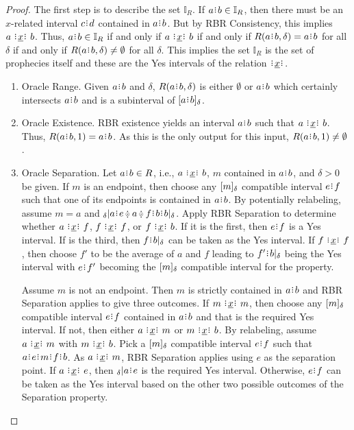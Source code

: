 \documentclass[12pt]{article}
\begin{document}
\begin{proof}

    The first step is to describe the set $\mathbb{I}_R$. If $a\rint b \in \mathbb{I}_R$, then there must be an $x$-related interval $c\rint d$ contained in $a\rint b$. But by RBR Consistency, this implies $a \xrel b$. Thus, $a\rint b \in \mathbb{I}_R$ if and only if $a \xrel b$ if and only if $R(a\rint b, \delta) = a\rint b$ for all $\delta$ if and only if $R(a\rint b, \delta) \neq \emptyset$ for all $\delta$. This implies the set $\mathbb{I}_R$ is the set of prophecies itself and these are the Yes intervals of the relation $\xrel$. 

    \begin{enumerate}
        \item Oracle Range. Given $a\rint b$ and $\delta$, $R(a\rint b, \delta)$ is either $\emptyset$ or $a\rint b$ which certainly intersects $a\rint b$ and is a subinterval  of $\halo{a\rint b}$.
        \item Oracle Existence. RBR existence yields an interval $a\rint b$ such that $a \xrel b$. Thus, $R(a\rint b, 1) = a\rint b$. As this is the only output for this input, $R(a\rint b, 1) \neq \emptyset$. 
        \item Oracle Separation. Let $a\rint b \in R$, i.e., $a \xrel b$, $m$ contained in $a\rint b$, and $\delta >0$ be given. If $m$ is an endpoint, then choose any $[m]_{\delta}$ compatible interval $e\rint f$ such that one of its endpoints is contained in $a\rint b$. By potentially relabeling, assume $m =a$ and ${}_\delta |a\rint e\betneq a \betneq f\rint b\rint b|_\delta$. Apply RBR Separation to determine whether $a \xrel f$, $f \xrel f$, or $f \xrel b$. If it is the first, then $e\rint f$ is a Yes interval. If is the third, then $f\rint b|_\delta$ can be taken as the Yes interval. If $f \xrel f$, then choose $f'$ to be the average of $a$ and $f$ leading to $f'\rint b|_\delta$ being the Yes interval with $e\rint f'$ becoming the $[m]_{\delta}$ compatible interval for the property. 

        Assume $m$ is not an endpoint. Then $m$ is strictly contained in $a\rint b$ and RBR Separation applies to give three outcomes. If $m \xrel m$, then choose any $[m]_{\delta}$ compatible interval $e\rint f$  contained in $a\rint b$ and that is the required Yes interval. If not, then either $a \xrel m$ or $m \xrel b$. By relabeling, assume $a \xrel m$ with \sout{$m \xrel b$}. Pick a $[m]_{\delta}$ compatible interval $e\rint f$ such that $a\rint e\rint m\rint f\rint b$. As $a \xrel m$, RBR Separation applies using $e$ as the separation point. If $a \xrel e$, then ${}_\delta | a\rint e$ is the required Yes interval. Otherwise, $e\rint f$ can be taken as the Yes interval based on the other two possible outcomes of the Separation property. 


\end{enumerate}
\end{proof}
\end{document}
